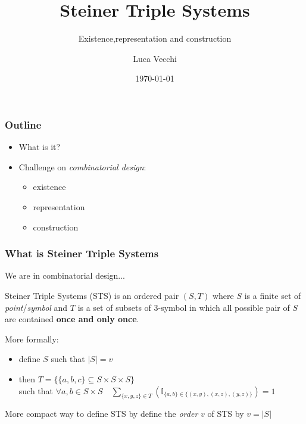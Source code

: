 \documentclass{beamer}
\title{Steiner Triple Systems}
\subtitle{Existence,representation and construction}
\author{Luca Vecchi}
\institute{University of Milan}
\date{\today}
\begin{document}
	\begin{frame}
	\titlepage
	\end{frame}
	
	\begin{frame}
		\frametitle{Outline}
		\begin{itemize}
			\item What is it? 
			\item Challenge on \textit{combinatorial design}:
			\begin{itemize}
				\item existence
				\item representation
				\item construction
			\end{itemize}
		\end{itemize}
	\end{frame}

	
	\begin{frame}
		\frametitle{What is Steiner Triple Systems }
		We are in combinatorial design...
		\begin{block}{Steiner Triple Systems (STS)}
			is an ordered pair $(S,T)$ where $S$ is a finite set of \textit{point}/\textit{symbol} and $T$ is a set of subsets of 3-symbol in which all possible pair of $S$ are contained \textbf{once and only once}.\\
			 
		\end{block}
	
	\pause
	More formally:\\
	\begin{itemize}
		\item define $S$ such that $|S|=v$
		\item 	then $T = \{ \{a,b,c\} \subseteq S\times S \times S\}$\\
		 such that $\forall a,b \in S \times S\quad \sum_{\{x,y,z\} \in T} (\mathbb{I}_{ \{ a,b \} \in \{ (x,y), (x,z) , (y,z)  \} }) = 1 $
	\end{itemize}
	More compact way to define STS by define the \textit{order} $v$ of STS by $v = |S|$
	\end{frame}
\end{document}
